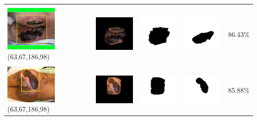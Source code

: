 \begin{table}[H]
\begin{tabular}{|m{1.0in}|m{1.0in}|m{1.0in}|m{1.0in}|m{0.6in}|}
		&  &  & \\
		\includegraphics[width=1.0in]{gambar/hasil_segmentasi/luka_hitam/image_39_rect.jpg} {\centering\fontsize{10}{10}\selectfont(63,67,186,98)}&
		\includegraphics[width=1.0in]{gambar/hasil_segmentasi/luka_hitam/result_39.jpg}&
		\includegraphics[width=1.0in]{gambar/hasil_segmentasi/luka_hitam/mask_r_39.jpg}&
		\includegraphics[width=1.0in]{gambar/hasil_segmentasi/luka_hitam/39_r.jpg}&
		86.43\% \\
		\hline 

		&  &  & \\
		\includegraphics[width=1.0in]{gambar/hasil_segmentasi/luka_hitam/image_41_rect.jpg} {\centering\fontsize{10}{10}\selectfont(63,67,186,98)}&
		\includegraphics[width=1.0in]{gambar/hasil_segmentasi/luka_hitam/result_41.jpg}&
		\includegraphics[width=1.0in]{gambar/hasil_segmentasi/luka_hitam/mask_r_41.jpg}&
		\includegraphics[width=1.0in]{gambar/hasil_segmentasi/luka_hitam/41_r.jpg}&
		85.88\% \\
		\hline 
	\end{tabular}
\end{table}

